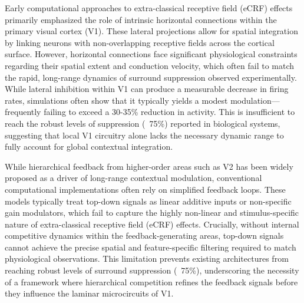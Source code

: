 Early computational approaches to extra-classical receptive field (eCRF) effects primarily emphasized the role of intrinsic horizontal connections within the primary visual cortex (V1). These lateral projections allow for spatial integration by linking neurons with non-overlapping receptive fields across the cortical surface. However, horizontal connections face significant physiological constraints regarding their spatial extent and conduction velocity, which often fail to match the rapid, long-range dynamics of surround suppression observed experimentally. While lateral inhibition within V1 can produce a measurable decrease in firing rates, simulations often show that it typically yields a modest modulation—frequently failing to exceed a 30-35\% reduction in activity. This is insufficient to reach the robust levels of suppression (~75\%) reported in biological systems, suggesting that local V1 circuitry alone lacks the necessary dynamic range to fully account for global contextual integration.

While hierarchical feedback from higher-order areas such as V2 has been widely proposed as a driver of long-range contextual modulation, conventional computational implementations often rely on simplified feedback loops. These models typically treat top-down signals as linear additive inputs or non-specific gain modulators, which fail to capture the highly non-linear and stimulus-specific nature of extra-classical receptive field (eCRF) effects. Crucially, without internal competitive dynamics within the feedback-generating areas, top-down signals cannot achieve the precise spatial and feature-specific filtering required to match physiological observations. This limitation prevents existing architectures from reaching robust levels of surround suppression (~75\%), underscoring the necessity of a framework where hierarchical competition refines the feedback signals before they influence the laminar microcircuits of V1.

